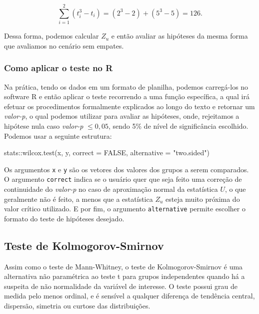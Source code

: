 \documentclass[
  letterpaper,
  DIV=11,
  numbers=noendperiod]{scrreprt}
\newenvironment{Shaded}{\begin{snugshade}}{\end{snugshade}}
\newcommand{\AttributeTok}[1]{\textcolor[rgb]{0.40,0.45,0.13}{#1}}
\newcommand{\ConstantTok}[1]{\textcolor[rgb]{0.56,0.35,0.01}{#1}}
\newcommand{\FunctionTok}[1]{\textcolor[rgb]{0.28,0.35,0.67}{#1}}
\newcommand{\NormalTok}[1]{\textcolor[rgb]{0.00,0.23,0.31}{#1}}
\newcommand{\SpecialCharTok}[1]{\textcolor[rgb]{0.37,0.37,0.37}{#1}}
\newcommand{\StringTok}[1]{\textcolor[rgb]{0.13,0.47,0.30}{#1}}
\begin{document}
\[\sum_{i=1}^2\left(t_i^3-t_i\right) = (2^3 - 2) + (5^3 - 5) = 126.\]

Dessa forma, podemos calcular \(Z_u\) e então avaliar as hipóteses da
mesma forma que avaliamos no cenário sem empates.

\hypertarget{como-aplicar-o-teste-no-r}{%
\subsubsection{Como aplicar o teste no
R}\label{como-aplicar-o-teste-no-r}}

Na prática, tendo os dados em um formato de planilha, podemos
carregá-los no software R e então aplicar o teste recorrendo a uma
função específica, a qual irá efetuar os procedimentos formalmente
explicados ao longo do texto e retornar um \emph{valor-p}, o qual
podemos utilizar para avaliar as hipóteses, onde, rejeitamos a hipótese
nula caso \emph{valor-p} \(\leq 0,05\), sendo 5\% de nível de
significância escolhido. Podemos usar a seguinte estrutura:

\begin{Shaded}
\begin{Highlighting}[]
\NormalTok{stats}\SpecialCharTok{::}\FunctionTok{wilcox.test}\NormalTok{(x, y, }\AttributeTok{correct =} \ConstantTok{FALSE}\NormalTok{,  }\AttributeTok{alternative =} \StringTok{"two.sided"}\NormalTok{)}
\end{Highlighting}
\end{Shaded}

Os argumentos \texttt{x} e \texttt{y} são os vetores dos valores dos
grupos a serem comparados. O argumento \texttt{correct} indica se o
usuário quer que seja feito uma correção de continuidade do
\emph{valor-p} no caso de aproximação normal da estatística \(U\), o que
geralmente não é feito, a menos que a estatística \(Z_u\) esteja muito
próxima do valor crítico utilizado. E por fim, o argumento
\texttt{alternative} permite escolher o formato do teste de hipóteses
desejado.

\hypertarget{teste-de-kolmogorov-smirnov}{%
\subsection{Teste de
Kolmogorov-Smirnov}\label{teste-de-kolmogorov-smirnov}}

Assim como o teste de Mann-Whitney, o teste de Kolmogorov-Smirnov é uma
alternativa não paramétrica ao teste t para grupos independentes quando
há a suspeita de não normalidade da variável de interesse. O teste
possui grau de medida pelo menos ordinal, e é sensível a qualquer
diferença de tendência central, dispersão, simetria ou curtose das
distribuições.
\end{document}
